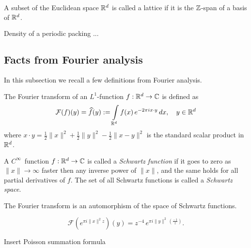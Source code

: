 \begin{definition}\label{EuclideanLattice.is_lattice}\leanok
  A subset of the Euclidean space $\mathbb{R}^d$ is called a lattice if it is the $\mathbb{Z}$-span of a basis of $\mathbb{R}^d$.
\end{definition}

\begin{lemma}\label{def: Density of periodic packing} \notready
  Density of a periodic packing ...
\end{lemma}
\subsection{Facts from Fourier analysis}

In this subsection we recall a few definitions from Fourier analysis.
\begin{definition}\label{def: Fourier Transform definition} %
The Fourier transform of an $L^1$-function $f:\mathbb{R}^d\to\mathbb{C}$ is defined as
$$\mathcal{F}(f)(y)=\widehat{f}(y):=\int\limits_{\mathbb{R}^d} f(x)\,e^{-2\pi i x\cdot y}\,dx,\quad y\in\mathbb{R}^d $$
where $x\cdot y=\frac12\|x\|^2+\frac12\|y\|^2-\frac12\|x-y\|^2$ is the standard scalar product in $\mathbb{R}^d$.
\end{definition}
\begin{definition}
A $C^\infty$~function $f:\mathbb{R}^d\to\mathbb{C}$ is called a \emph{Schwartz function} if it goes to zero as $\|x\|\to\infty$ faster then any inverse power of $\|x\|$, and the same holds for all partial derivatives of $f$. The set of all Schwartz functions is called a \emph{Schwartz space}.
\end{definition}
\begin{lemma}\label{lemma: Fourier transform is automorphism}
  The Fourier transform is an automorphism of the space of Schwartz functions.
\end{lemma}
\begin{lemma}\label{lemma: Gaussian Fourier}
\begin{equation}\mathcal{F}(e^{\pi i  \|x\|^2 z})(y)=z^{-4}\,e^{\pi i \|y\|^2 \,(\frac{-1}{z}) }.\end{equation}
\end{lemma}
\begin{theorem}\label{thm: Poisson summation formula}
  Insert Poisson summation formula
\end{theorem}

